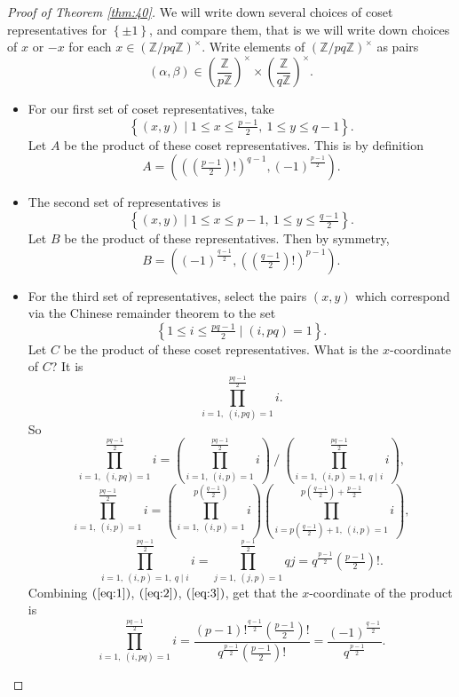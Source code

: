 \documentclass{article}
\newcommand{\Z}{\mathbb{Z}}
\newcommand{\rb}[1]{\left( #1 \right)}
\newcommand{\cb}[1]{\left\{ #1 \right\}}
\newcommand{\Unit}[1]{\rb{\dfrac{\Z}{#1\Z}}^\times}
\newcommand{\unit}[1]{\rb{\Z / #1\Z}^\times}
\theoremstyle{definition}\newtheorem{definition}{Definition}
\theoremstyle{definition}\newtheorem{remark}[definition]{Remark}
\theoremstyle{definition}\newtheorem*{example}{Example}
\theoremstyle{definition}\newtheorem*{note}{Note}
\begin{document}
\begin{proof}[Proof of Theorem \ref{thm:40}]
We will write down several choices of coset representatives for $ \cb{\pm 1} $, and compare them, that is we will write down choices of $ x $ or $ -x $ for each $ x \in \unit{pq} $. Write elements of $ \unit{pq} $ as pairs
$$ \rb{\alpha, \beta} \in \Unit{p} \times \Unit{q}. $$
\begin{itemize}
\item For our first set of coset representatives, take
$$ \cb{\rb{x, y} \mid 1 \le x \le \tfrac{p - 1}{2}, \ 1 \le y \le q - 1}. $$
Let $ A $ be the product of these coset representatives. This is by definition
$$ A = \rb{\rb{\rb{\tfrac{p - 1}{2}}!}^{q - 1}, \rb{-1}^{\tfrac{p - 1}{2}}}. $$
\item The second set of representatives is
$$ \cb{\rb{x, y} \mid 1 \le x \le p - 1, \ 1 \le y \le \tfrac{q - 1}{2}}. $$
Let $ B $ be the product of these representatives. Then by symmetry,
$$ B = \rb{\rb{-1}^{\tfrac{q - 1}{2}}, \rb{\rb{\tfrac{q - 1}{2}}!}^{p - 1}}. $$
\item For the third set of representatives, select the pairs $ \rb{x, y} $ which correspond via the Chinese remainder theorem to the set
$$ \cb{1 \le i \le \tfrac{pq - 1}{2} \mid \rb{i, pq} = 1}. $$
Let $ C $ be the product of these coset representatives. What is the $ x $-coordinate of $ C $? It is
$$ \prod_{i = 1, \ \rb{i, pq} = 1}^{\tfrac{pq - 1}{2}} i. $$
So
\begin{equation}
\label{eq:1}
\prod_{i = 1, \ \rb{i, pq} = 1}^{\tfrac{pq - 1}{2}} i = \rb{\prod_{i = 1, \ \rb{i, p} = 1}^{\tfrac{pq - 1}{2}} i} \ \Bigg/ \ \rb{\prod_{i = 1, \ \rb{i, p} = 1, \ q \mid i}^{\tfrac{pq - 1}{2}} i},
\end{equation}
\begin{equation}
\label{eq:2}
\prod_{i = 1, \ \rb{i, p} = 1}^{\tfrac{pq - 1}{2}} i = \rb{\prod_{i = 1, \ \rb{i, p} = 1}^{p\rb{\tfrac{q - 1}{2}}} i}\rb{\prod_{i = p\rb{\tfrac{q - 1}{2}} + 1, \ \rb{i, p} = 1}^{p\rb{\tfrac{q - 1}{2}} + \tfrac{p - 1}{2}} i},
\end{equation}
\begin{equation}
\label{eq:3}
\prod_{i = 1, \ \rb{i, p} = 1, \ q \mid i}^{\tfrac{pq - 1}{2}} i = \prod_{j = 1, \ \rb{j, p} = 1}^{\tfrac{p - 1}{2}} qj = q^{\tfrac{p - 1}{2}}\rb{\tfrac{p - 1}{2}}!.
\end{equation}
Combining $ \rb{\ref{eq:1}} $, $ \rb{\ref{eq:2}} $, $ \rb{\ref{eq:3}} $, get that the $ x $-coordinate of the product is
$$ \prod_{i = 1, \ \rb{i, pq} = 1}^{\tfrac{pq - 1}{2}} i = \dfrac{\rb{p - 1}!^{\tfrac{q - 1}{2}}\rb{\tfrac{p - 1}{2}}!}{q^{\tfrac{p - 1}{2}}\rb{\tfrac{p - 1}{2}}!} = \dfrac{\rb{-1}^{\tfrac{q - 1}{2}}}{q^{\tfrac{p - 1}{2}}}. $$

\end{itemize}
\end{proof}
\end{document}
